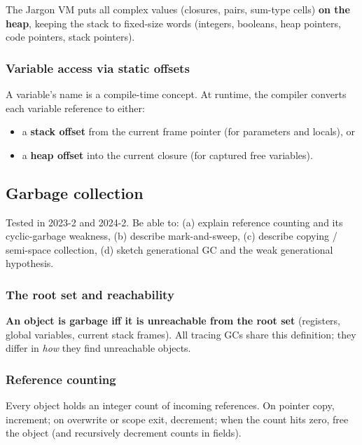 \documentclass[11pt,a4paper]{article}
\begin{document}
The Jargon VM puts all complex values (closures, pairs, sum-type cells) \textbf{on the heap}, keeping the stack to fixed-size words (integers, booleans, heap pointers, code pointers, stack pointers).

\subsubsection*{Variable access via static offsets}

A variable's name is a compile-time concept. At runtime, the compiler converts each variable reference to either:
\begin{itemize}[leftmargin=*,itemsep=0pt]
  \item a \textbf{stack offset} from the current frame pointer (for parameters and locals), or
  \item a \textbf{heap offset} into the current closure (for captured free variables).
\end{itemize}

\subsection{Garbage collection}

\begin{useful}
Tested in 2023-2 and 2024-2. Be able to: (a) explain reference counting and its cyclic-garbage weakness, (b) describe mark-and-sweep, (c) describe copying / semi-space collection, (d) sketch generational GC and the weak generational hypothesis.
\end{useful}

\subsubsection*{The root set and reachability}

\textbf{An object is garbage iff it is unreachable from the root set} (registers, global variables, current stack frames). All tracing GCs share this definition; they differ in \emph{how} they find unreachable objects.

\subsubsection*{Reference counting}

Every object holds an integer count of incoming references. On pointer copy, increment; on overwrite or scope exit, decrement; when the count hits zero, free the object (and recursively decrement counts in fields).
\end{document}
